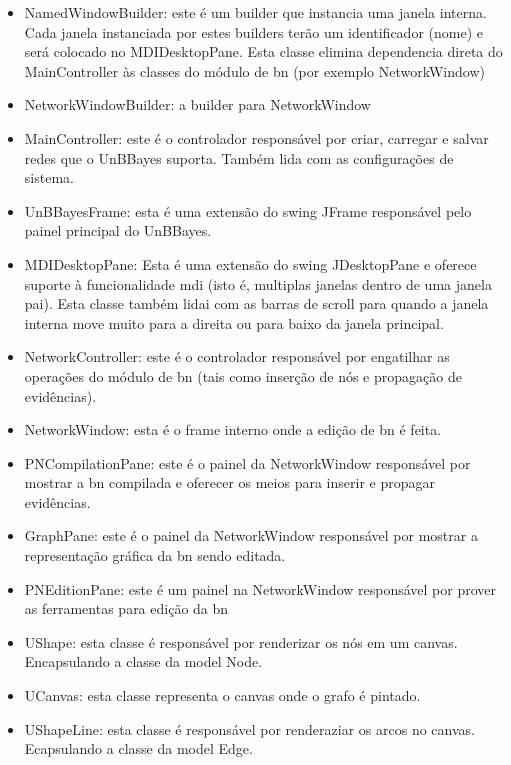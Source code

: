 \begin{itemize}
	\item NamedWindowBuilder: este é um builder que instancia uma janela interna. Cada janela instanciada por estes builders terão um identificador (nome) e será colocado no MDIDesktopPane. Esta classe elimina dependencia direta do MainController às classes do módulo de \gls{bn} (por exemplo NetworkWindow)

	\item NetworkWindowBuilder: a builder para NetworkWindow
	
	\item MainController: este é o controlador responsável por criar, carregar e salvar redes que o UnBBayes suporta. Também lida com as configurações de sistema.
	
	\item UnBBayesFrame: esta é uma extensão do swing JFrame responsável pelo painel principal do UnBBayes.
	
	\item MDIDesktopPane: Esta é uma extensão do swing JDesktopPane e oferece suporte à funcionalidade \gls{mdi} (isto é, multiplas janelas dentro de uma janela pai). Esta classe também lidai com as barras de scroll para quando a janela interna move muito para a direita ou para baixo da janela principal.
	
	\item NetworkController: este é o controlador responsável por engatilhar as operações do módulo de \gls{bn} (tais como inserção de nós e propagação de evidências).

	\item NetworkWindow: esta é o frame interno onde a edição de \gls{bn} é feita.

	\item PNCompilationPane: este é o painel da NetworkWindow responsável por mostrar a \gls{bn} compilada e oferecer os meios para inserir e propagar evidências.
	
	\item GraphPane: este é o painel da NetworkWindow responsável por mostrar a representação gráfica da \gls{bn} sendo editada.

	\item PNEditionPane: este é um painel na NetworkWindow responsável por prover as ferramentas para edição da \gls{bn}
	
	\item UShape: esta classe é responsável por renderizar os nós em um canvas. Encapsulando a classe da model Node.

	\item UCanvas: esta classe representa o canvas onde o grafo é pintado.

	\item UShapeLine: esta classe é responsável por renderaziar os arcos no canvas. Ecapsulando a classe da model Edge.
\end{itemize}



